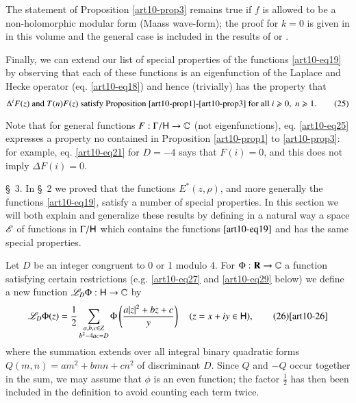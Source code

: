 The statement of Proposition \ref{art10-prop3} remains true if $f$ is allowed to be a non-holomorphic modular form (Maass wave-form); the proof for $k=0$ is given in \cite{art10-12} in this volume and the general case is included in the results of \cite{art10-1} or \cite{art10-4}.

Finally, we can extend our list of special properties of the functions \eqref{art10-eq19} by observing that each of these functions is an eigenfunction of the Laplace and Hecke operator (eq. \eqref{art10-eq18}) and hence (trivially) has the property that
\begin{equation*}
\Delta^i F (z) \text{ and } T (n) F (z) \text{ satisfy Proposition \ref{art10-prop1}-\ref{art10-prop3} for all } i \geqslant 0, \; n \geqslant 1. \tag{25}\label{art10-eq25}
\end{equation*}

Note that for general functions $F: \Gamma / \mathsf{H} \to \mathbb{C}$ (not eigenfunctions), eq. \eqref{art10-eq25} expresses a property no contained in Proposition \ref{art10-prop1} to \ref{art10-prop3}: for example, eq. \eqref{art10-eq21} for $D = - 4$ says that $F (i) =0$, and this does not imply $\Delta F(i) =0$.

\S~3. In \S~2 we proved that the functions $E^\ast (z, \rho)$, and more generally the functions \eqref{art10-eq19}, satisfy a number of special properties. In this section we will both explain and generalize these results by defining in a natural way a space $\mathscr{E}$ of functions in $\Gamma / \mathsf{H}$ which contains the functions $\eqref{art10-eq19}$ and has the same special properties. 

Let $D$ be an integer congruent to 0 or 1 modulo 4. For $\Phi: \mathbf{R} \to \mathbb{C}$ a function satisfying certain restrictions (e.g. \eqref{art10-eq27} and \eqref{art10-eq29} below) we define a new function $\mathscr{L}_D \Phi: \mathsf{H} \to \mathbb{C}$ by
\begin{equation*}
\mathscr{L}_D \Phi (z) = \frac{1}{2} \sum\limits_{\substack{a, b, c \in Z\\ b^2- 4 a c = D}} \Phi \left(\frac{a|z|^2 + b z +c}{y} \right) \quad (z = x + iy \in \mathsf{H}), \tag{26}\eqref{art10-26}
\end{equation*}
where the summation extends over all integral binary quadratic forms $Q(m,n) = am^2 + bmn + cn^2$ of discriminant $D$. Since $Q$ and $-Q$ occur together in the sum, we may assume that $\phi$ is an even function; the factor $\frac{1}{2}$ has then been included in the definition to avoid counting each term twice. 

